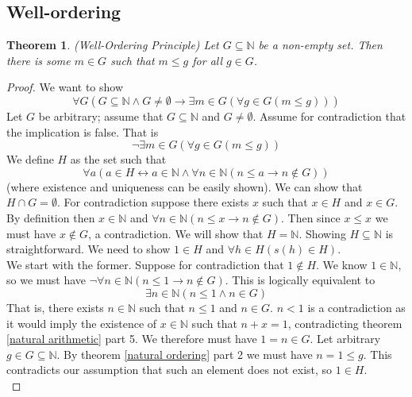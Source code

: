\documentclass{report}
\newtheorem{theorem}[theo]{Theorem}
\begin{document}
\subsection{Well-ordering}
\begin{theorem}\label{N_wellordering}(Well-Ordering Principle)
Let $G\subseteq\mathbb N$ be a non-empty set. Then there is some $m\in G$ such that $m\leq g$ for all $g\in G$.
\end{theorem}
\begin{proof}
We want to show
\begin{equation*}
\forall G(G\subseteq\mathbb N\land G\neq\emptyset\to\exists m\in G(\forall g\in G(m\leq g)))
\end{equation*}
Let $G$ be arbitrary; assume that $G\subseteq\mathbb N$ and $G\neq\emptyset$. Assume for contradiction that the implication is false. That is
\begin{equation*}
\neg\exists m\in G(\forall g\in G(m\leq g))
\end{equation*}
We define $H$ as the set such that
\begin{equation*}
\forall a(a\in H\leftrightarrow a\in\mathbb N\land\forall n\in\mathbb N(n\le a\to n\notin G))
\end{equation*}
(where existence and uniqueness can be easily shown). We can show that $H\cap G=\emptyset$.
For contradiction suppose there exists $x$ such that $x\in H$ and $x\in G$. By definition then $x\in\mathbb N$ and $\forall n\in\mathbb N(n\leq x\to n\notin G)$. Then since $x\leq x$ we must have 
$x\notin G$, a contradiction. We will show that $H=\mathbb N$. Showing $H\subseteq\mathbb N$ is straightforward. We need to show $1\in H$ and $\forall h\in H(s(h)\in H)$.\\
\indent We start with the former. Suppose for contradiction that $1\notin H$. We know $1\in\mathbb N$, so we must have $\neg\forall n\in\mathbb N(n\leq 1\to n\notin G)$. This
is logically equivalent to
\begin{equation*}
\exists n\in\mathbb N(n\leq 1\land n\in G)
\end{equation*}
That is, there exists $n\in\mathbb N$ such that $n\leq 1$ and $n\in G$. $n<1$ is a contradiction as it would imply the existence of $x\in\mathbb N$ such that $n+x=1$, contradicting theorem
\ref{natural arithmetic} part 5. We therefore must have $1=n\in G$. Let arbitrary $g\in G\subseteq \mathbb N$. By theorem \ref{natural ordering} part 2 we must have $n=1\leq g$. This
contradicts our assumption that such an element does not exist, so $1\in H$.\\

\end{proof}
\end{document}
